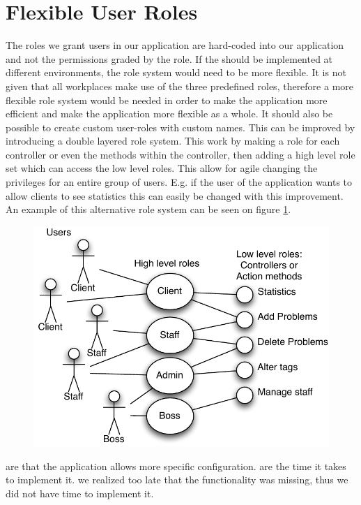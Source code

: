\section{Flexible User Roles}
\label{sec:agile_roles}
The roles we grant users in our application are hard-coded into our application and not the permissions graded by the role.
If the \hdesk[] should be implemented at different environments, the role system would need to be more flexible. 
It is not given that all workplaces make use of the three predefined roles, therefore a more flexible role system would be needed in order to make the application more efficient and make the application more flexible as a whole.
It should also be possible to create custom user-roles with custom names.
This can be improved by introducing a double layered role system.  
This work by making a role for each controller or even the methods within the controller, then adding a high level role set which can access the low level roles. 
This allow for agile changing the privileges for an entire group of users. 
E.g. if the user of the application wants to allow clients to see statistics this can easily be changed with this improvement. An example of this alternative role system can be seen on figure \ref{fig:improved_role_system}.

\begin{figure}[h]
\begin{center}
\includegraphics[scale=0.7]{input/epilogue/improvements/improved_role_system.pdf}
\label{fig:improved_role_system}
\end{center}
\end{figure}

 are that the application allows more specific configuration. 
 are the time it takes to implement it.
 we realized too late that the functionality was missing, thus we did not have time to implement it.


